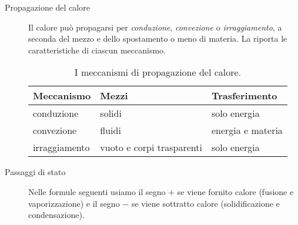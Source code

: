 \documentclass[a4paper,11pt,italian]{article}
\begin{document}
\begin{description}
  
  \item[Propagazione del calore] 
  Il calore può propagarsi per \emph{conduzione}, \emph{convezione} o \emph{irraggiamento}, a seconda del mezzo e dello spostamento o meno di materia. La  riporta le caratteristiche di ciascun meccanismo.

\begin{table}[htb]\centering\footnotesize
\begin{tabular}{lll}\toprule
\textbf{Meccanismo} & \textbf{Mezzi}            & \textbf{Trasferimento}\\\midrule
conduzione          & solidi                    & solo energia\\\addlinespace[1em]
convezione          & fluidi                    & energia e materia\\\addlinespace[1em]
irraggiamento       & vuoto e corpi trasparenti & solo energia\\\bottomrule
\end{tabular}
\caption{I meccanismi di propagazione del calore.}
\label{tab:conduzione}
\end{table}


  
  \item[Passaggi di stato] 
  Nelle formule seguenti usiamo il segno $+$ se viene fornito calore (fusione e vaporizzazione) e il segno $-$ se viene sottratto calore (solidificazione e condensazione).
  

\end{description}
\end{document}
